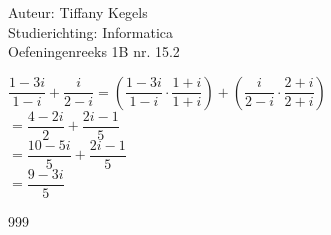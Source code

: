 \documentclass[a4paper]{article}
\begin{document}
  
\noindent \large Auteur: Tiffany Kegels \\
\noindent \large Studierichting: Informatica\\
\noindent \large Oefeningenreeks 1B nr. 15.2\\

\medskip

\normalsize

$\dfrac{1-3i}{1-i} + \dfrac{i}{2-i} = \left( \dfrac{1-3i}{1-i} \cdot \dfrac{1+i}{1+i} \right) + \left(\dfrac{i}{2-i} \cdot \dfrac{2+i}{2+i} \right)$\\

$= \dfrac{4-2i}{2} + \dfrac{2i-1}{5}$\\

$= \dfrac{10-5i}{5} + \dfrac{2i-1}{5}$\\

$= \dfrac{9-3i}{5}$\\

\begin{thebibliography}{999}

\end{thebibliography}
\end{document}
